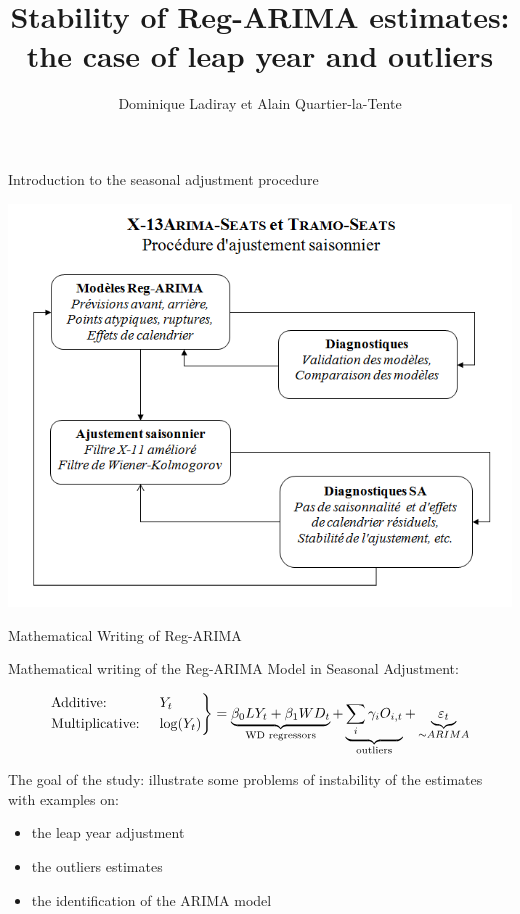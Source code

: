 \documentclass[10pt,xcolor=table,color={dvipsnames,usenames},ignorenonframetext,usepdftitle=false,french]{beamer}
\title{Stability of Reg-ARIMA estimates: the case of leap year and outliers}
\author{Dominique Ladiray et Alain Quartier-la-Tente}
\date{}
\begin{document}

\begin{frame}{Introduction to the seasonal adjustment procedure}

\centering
\includegraphics[height = 0.9\textheight]{img/MethodesX13-TS.png}

\end{frame}

\begin{frame}{Mathematical Writing of Reg-ARIMA}

Mathematical writing of the Reg-ARIMA Model in Seasonal Adjustment:

\[
 \begin{drcases}
\text{Additive: }& Y_t \\
\text{Multiplicative: }& \log(Y_t) 
\end{drcases} 
= \underbrace{\beta_0 LY_t + \beta_1 WD_t}_{\text{WD regressors}} + 
\underbrace{\sum_{i}\gamma_iO_{i,t}}_{\mathclap{\text{outliers}}} + \underbrace{\varepsilon_t}_{\sim ARIMA}
\]

\medskip

\pause
The goal of the study: illustrate some problems of instability of the
estimates with examples on:

\begin{itemize}
\item
  the leap year adjustment
\item
  the outliers estimates
\item
  the identification of the ARIMA model
\end{itemize}

\end{frame}
\end{document}
